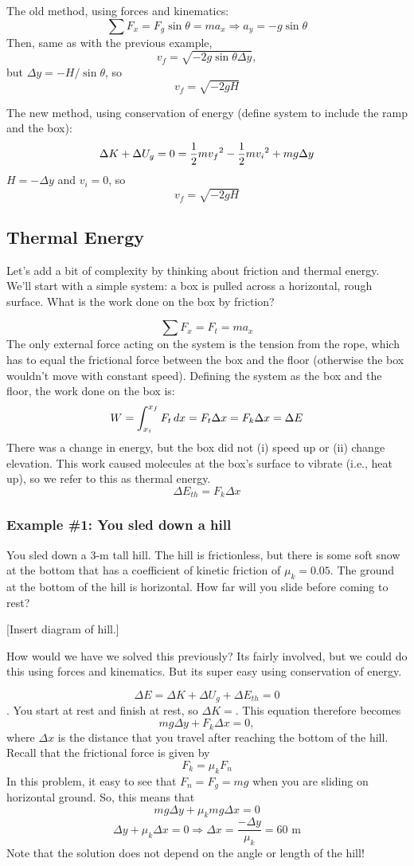 The old method, using forces and kinematics:
$$\sum F_x=F_g\sin\theta=ma_x\Rightarrow a_y=-g\sin\theta$$
Then, same as with the previous example,
$$v_f=\sqrt{-2g\sin\theta\Delta{y}},$$
but $\Delta{y}=-H/\sin\theta$, so
$$\boxed{v_f=\sqrt{-2gH}}$$

The new method, using conservation of energy (define system to include the ramp and the box):
$$\Delta K+\Delta U_g=0=\frac{1}{2}mv_f\displaystyle^2-\frac{1}{2}mv_i\displaystyle^2+mg\Delta{y}$$
$H=-\Delta{y}$ and $v_i=0$, so
$$\boxed{v_f=\sqrt{-2gH}}$$

\subsection{Thermal Energy}
Let's add a bit of complexity by thinking about friction and thermal energy. We'll start with a simple system: a box is pulled across a horizontal, rough surface. What is the work done on the box by friction?

$$\sum F_x=F_t=ma_x$$
The only external force acting on the system is the tension from the rope, which has to equal the frictional force between the box and the floor (otherwise the box wouldn't move with constant speed). Defining the system as the box and the floor, the work done on the box is:
$$W=\displaystyle\int_{x_i}^{x_f}F_t\,dx=F_t\Delta{x}=F_k\Delta{x}=\Delta{E}$$
There was a change in energy, but the box did not (i) speed up or (ii) change elevation. This work caused molecules at the box's surface to vibrate (i.e., heat up), so we refer to this as thermal energy.
$$\boxed{\Delta{E_{th}}=F_k\Delta{x}}$$

\subsubsection{Example \#1: You sled down a hill}
You sled down a 3-m tall hill. The hill is frictionless, but there is some soft snow at the bottom that has a coefficient of kinetic friction of $\mu_k=0.05$. The ground at the bottom of the hill is horizontal. How far will you slide before coming to rest?

[Insert diagram of hill.]
\vspace{5cm}

How would we have we solved this previously? Its fairly involved, but we could do this using forces and kinematics. But its super easy using conservation of energy.

$$\Delta{E}=\Delta{K}+\Delta{U_g}+\Delta{E_{th}}=0$$.
You start at rest and finish at rest, so $\Delta{K}=$. This equation therefore becomes
$$mg\Delta{y}+F_k\Delta{x}=0,$$
where $\Delta{x}$ is the distance that you travel after reaching the bottom of the hill. Recall that the frictional force is given by
$$F_k=\mu_kF_n$$
In this problem, it easy to see that $F_n=F_g=mg$ when you are sliding on horizontal ground. So, this means that
$$mg\Delta{y}+\mu_k mg\Delta{x}=0$$
$$\Delta{y}+\mu_k \Delta{x}=0\Rightarrow \boxed{\Delta{x}=\frac{-\Delta{y}}{\mu_k}=60\mbox{ m}}$$
Note that the solution does not depend on the angle or length of the hill!


